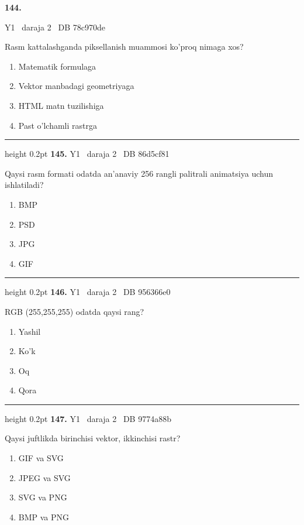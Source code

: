 \documentclass[10pt,a4paper,oneside]{article}
\begin{document}
\hypertarget{q144}{\textbf{\color{ink}144.}}  {\color{muted}\scriptsize Y1 \textbullet\ daraja 2 \textbullet\ DB 78c970de}
\par
Rasm kattalashganda piksellanish muammosi ko'proq nimaga xos?
\begin{enumerate}[label=\Alph*),leftmargin=9mm]
\item Matematik formulaga
\item Vektor manbadagi geometriyaga
\item HTML matn tuzilishiga
\item Past o'lchamli rastrga
\end{enumerate}
\vspace{2mm}\hrule height 0.2pt \vspace{4mm}
\hypertarget{q145}{\textbf{\color{ink}145.}}  {\color{muted}\scriptsize Y1 \textbullet\ daraja 2 \textbullet\ DB 86d5cf81}
\par
Qaysi rasm formati odatda an'anaviy 256 rangli palitrali animatsiya uchun ishlatiladi?
\begin{enumerate}[label=\Alph*),leftmargin=9mm]
\item BMP
\item PSD
\item JPG
\item GIF
\end{enumerate}
\vspace{2mm}\hrule height 0.2pt \vspace{4mm}
\hypertarget{q146}{\textbf{\color{ink}146.}}  {\color{muted}\scriptsize Y1 \textbullet\ daraja 2 \textbullet\ DB 956366e0}
\par
RGB (255,255,255) odatda qaysi rang?
\begin{enumerate}[label=\Alph*),leftmargin=9mm]
\item Yashil
\item Ko'k
\item Oq
\item Qora
\end{enumerate}
\vspace{2mm}\hrule height 0.2pt \vspace{4mm}
\hypertarget{q147}{\textbf{\color{ink}147.}}  {\color{muted}\scriptsize Y1 \textbullet\ daraja 2 \textbullet\ DB 9774a88b}
\par
Qaysi juftlikda birinchisi vektor, ikkinchisi rastr?
\begin{enumerate}[label=\Alph*),leftmargin=9mm]
\item GIF va SVG
\item JPEG va SVG
\item SVG va PNG
\item BMP va PNG
\end{enumerate}
\end{document}
